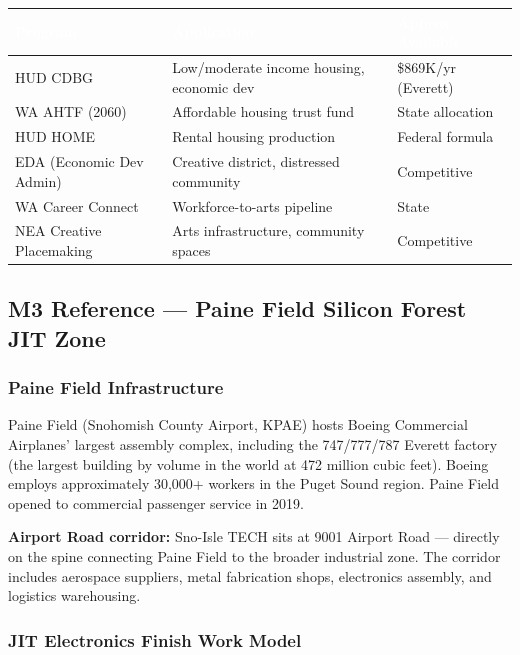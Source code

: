 \documentclass[11pt,letterpaper]{article}
\newcommand{\tableheader}[1]{\textbf{\sffamily\textcolor{white}{#1}}}
\begin{document}
\begin{center}
\begin{tabularx}{\textwidth}{L{3cm}XC{2.5cm}}
\toprule
{}
\tableheader{Program} & \tableheader{Application} & \tableheader{Approx. Available} \\
\midrule
HUD CDBG & Low/moderate income housing, economic dev & \$869K/yr (Everett) \\
WA AHTF (2060) & Affordable housing trust fund & State allocation \\
HUD HOME & Rental housing production & Federal formula \\
EDA (Economic Dev Admin) & Creative district, distressed community & Competitive \\
WA Career Connect & Workforce-to-arts pipeline & State \\
NEA Creative Placemaking & Arts infrastructure, community spaces & Competitive \\
\bottomrule
\end{tabularx}
\end{center}

\subsection{M3 Reference --- Paine Field Silicon Forest JIT Zone}

\subsubsection{Paine Field Infrastructure}

Paine Field (Snohomish County Airport, KPAE) hosts Boeing Commercial Airplanes' largest assembly complex, including the 747/777/787 Everett factory (the largest building by volume in the world at 472 million cubic feet). Boeing employs approximately 30,000+ workers in the Puget Sound region. Paine Field opened to commercial passenger service in 2019.

\textbf{Airport Road corridor:} Sno-Isle TECH sits at 9001 Airport Road --- directly on the spine connecting Paine Field to the broader industrial zone. The corridor includes aerospace suppliers, metal fabrication shops, electronics assembly, and logistics warehousing.

\subsubsection{JIT Electronics Finish Work Model}
\end{document}
